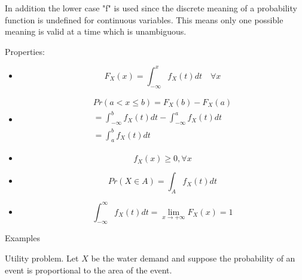 \documentclass{report}
\begin{document}
\begin{description}
\begin{mdframed}
             In addition the lower case "f" is used since
             the discrete meaning of a probability function
             is undefined for continuous variables. This
             means only one possible meaning is valid at 
             a time which is unambiguous.

             \vspace{10}

             Properties:
             \begin{itemize}
                 \item 
                     \begin{displaymath}
                        F_X(x) = \int_{-\infty}^{x} f_X(t)dt \quad \forall x
                     \end{displaymath}
                \item
                    \begin{gather}
                       Pr(a < x \le b) = F_X(b) - F_X(a)\\ 
                       = \int_{-\infty}^{b}f_X(t)dt -
                       \int_{-\infty}^{a} f_X(t)dt\\
                       = \int_a^b f_X(t)dt
                    \end{gather}
                \item 
                    \begin{displaymath}
                    f_X(x) \ge 0, \forall x
                    \end{displaymath}
                \item 
                    \begin{displaymath}
                    Pr(X \in A) = \int_A f_X(t)dt
                    \end{displaymath}
                \item
                   \begin{displaymath}
                       \int_{-\infty}^{\infty} f_X(t)dt
                       = \lim\limits_{x \to +\infty} F_X(x)
                       = 1
                   \end{displaymath}
             \end{itemize}
        \end{mdframed}
    \item {\Large Examples}
        \begin{mdframed}
            Utility problem. Let $X$ be the water
            demand and suppose the probability of an
            event is proportional to the area of the event.


\end{mdframed}
\end{description}
\end{document}
